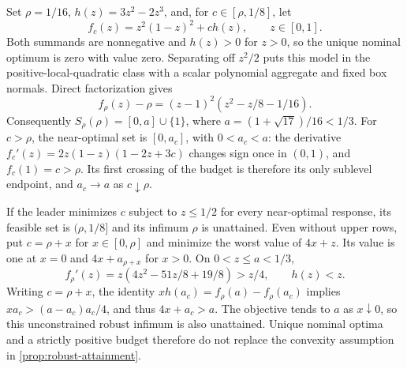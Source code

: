 \begin{example}
\label{ex:positive-budget-nonattainment}
Set $\rho=1/16$, $h(z)=3z^2-2z^3$, and, for $c\in[\rho,1/8]$, let
\[
                    f_c(z)=z^2(1-z)^2+ch(z),\qquad z\in[0,1].
\]
Both summands are nonnegative and $h(z)>0$ for $z>0$, so the unique
nominal optimum is zero with value zero. Separating off $z^2/2$ puts
this model in the positive-local-quadratic class with a scalar polynomial
aggregate and fixed box normals. Direct factorization gives
\[
 f_\rho(z)-\rho=(z-1)^2(z^2-z/8-1/16).
\]
Consequently $S_\rho(\rho)=[0,a]\cup\{1\}$, where
$a=(1+\sqrt{17})/16<1/3$. For $c>\rho$, the near-optimal set is
$[0,a_c]$, with $0<a_c<a$: the derivative
$f_c'(z)=2z(1-z)(1-2z+3c)$ changes sign once in $(0,1)$, and
$f_c(1)=c>\rho$. Its first crossing of the budget is therefore its
only sublevel endpoint, and $a_c\to a$ as $c\downarrow\rho$.

If the leader minimizes $c$ subject to $z\le1/2$ for every near-optimal
response, its feasible set is $(\rho,1/8]$ and its infimum $\rho$
is unattained. Even without upper rows, put $c=\rho+x$ for
$x\in[0,\rho]$ and minimize the worst value of $4x+z$. Its value
is one at $x=0$ and $4x+a_{\rho+x}$ for $x>0$. On $0<z\le a<1/3$,
\[
 f_\rho'(z)=z(4z^2-51z/8+19/8)>z/4,\qquad h(z)<z.
\]
Writing $c=\rho+x$, the identity
$x h(a_c)=f_\rho(a)-f_\rho(a_c)$ implies
$x a_c>(a-a_c)a_c/4$, and thus $4x+a_c>a$.
The objective tends to $a$ as $x\downarrow0$, so this unconstrained
robust infimum is also unattained. Unique nominal optima and a strictly
positive budget therefore do not replace the convexity assumption in
\cref{prop:robust-attainment}.
\end{example}

